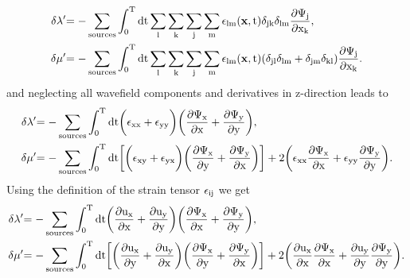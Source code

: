 \begin{equation} 
\begin{split}
\rm{\delta \lambda'} &\rm{= - \sum_{sources} \int_0^T dt \sum_l \sum_k \sum_j \sum_m \epsilon_{lm}(\mathbf{x},t) \delta_{jk} \delta_{lm} \frac{\partial \Psi_{j}}{\partial x_k},}\\
\rm{\delta \mu'} &\rm{= - \sum_{sources} \int_0^T dt \sum_l \sum_k \sum_j \sum_m \epsilon_{lm}(\mathbf{x},t) (\delta_{jl} \delta_{lm} + \delta_{jm} \delta_{kl}) \frac{\partial \Psi_{j}}{\partial x_k}.}
\end{split} 
\label{A3:60}
\end{equation}
and neglecting all wavefield components and derivatives in z-direction leads to 
\begin{equation} 
\begin{split}
\rm{\delta \lambda'} &\rm{= - \sum_{sources} \int_0^T dt \biggl(\epsilon_{xx} + \epsilon_{yy} \biggr) \biggl(\frac{\partial \Psi_{x}}{\partial x} + \frac{\partial \Psi_{y}}{\partial y}\biggr),}\\
\rm{\delta \mu'} &\rm{= - \sum_{sources} \int_0^T dt \biggl[\biggl(\epsilon_{xy} + \epsilon_{yx}\biggr) \biggl(\frac{\partial \Psi_{x}}{\partial y} + \frac{\partial \Psi_{y}}{\partial x}\biggr)\biggr] + 2 \biggl(\epsilon_{xx} \frac{\partial \Psi_{x}}{\partial x} + \epsilon_{yy} \frac{\partial \Psi_{y}}{\partial y}\biggr).}
\end{split} 
\end{equation}
Using the definition of the strain tensor $\rm{\epsilon_{ij}}$ we get
\begin{equation} 
\begin{split}
\rm{\delta \lambda'} &\rm{= - \sum_{sources} \int_0^T dt \biggl(\frac{\partial u_x}{\partial x}+\frac{\partial u_y}{\partial y}\biggr) \biggl(\frac{\partial \Psi_{x}}{\partial x} + \frac{\partial \Psi_{y}}{\partial y}\biggr),}\\
\rm{\delta \mu'} &\rm{= - \sum_{sources} \int_0^T dt \biggl[ \biggl(\frac{\partial u_x}{\partial y}+\frac{\partial u_y}{\partial x}\biggr) \biggl(\frac{\partial \Psi_{x}}{\partial y} + \frac{\partial \Psi_{y}}{\partial x}\biggr)\biggr] + 2 \biggl(\frac{\partial u_x}{\partial x} \frac{\partial \Psi_{x}}{\partial x} + \frac{\partial u_y}{\partial y} \frac{\partial \Psi_{y}}{\partial y}\biggr).}
\end{split} 
\label{A3:70}
\end{equation}
 

